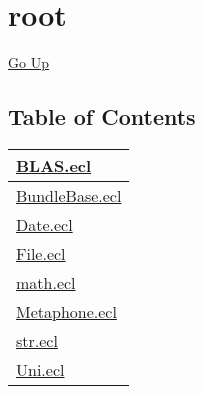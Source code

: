 \chapter*{\color{headtoc} root}
\hypertarget{ecldoc:toc:root}{}
\hyperlink{ecldoc:toc:}{Go Up}


\section*{Table of Contents}
{\renewcommand{\arraystretch}{1.5}
\begin{longtable}{|p{\textwidth}|}
\hline
\hyperlink{ecldoc:toc:BLAS}{BLAS.ecl} \\
\hline
\hyperlink{ecldoc:toc:BundleBase}{BundleBase.ecl} \\
\hline
\hyperlink{ecldoc:toc:Date}{Date.ecl} \\
\hline
\hyperlink{ecldoc:toc:File}{File.ecl} \\
\hline
\hyperlink{ecldoc:toc:math}{math.ecl} \\
\hline
\hyperlink{ecldoc:toc:Metaphone}{Metaphone.ecl} \\
\hline
\hyperlink{ecldoc:toc:str}{str.ecl} \\
\hline
\hyperlink{ecldoc:toc:Uni}{Uni.ecl} \\
\hline
\end{longtable}
}









